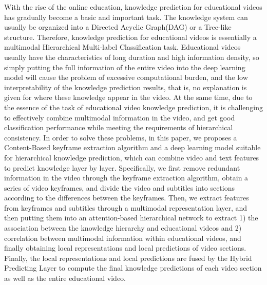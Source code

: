 \begin{abstract*}
    With the rise of the online education, knowledge prediction for educational videos has gradually become a basic and important task.
    The knowledge system can usually be organized into a Directed Acyclic Graph(DAG) or a Tree-like structure.
    Therefore, knowledge prediction for educational videos is essentially a multimodal Hierarchical Multi-label Classification task.
    Educational videos usually have the characteristics of long duration and high information density,
    so simply putting the full information of the entire video into the deep learning model will cause the problem of excessive computational burden,
    and the low interpretability of the knowledge prediction results,
    that is, no explanation is given for where these knowledge appear in the video.
    At the same time, due to the essence of the task of educational video knowledge prediction,
    it is challenging to effectively combine multimodal information in the video, and get good classification performance while meeting the requirements of hierarchical consistency.
    In order to solve these problems, in this paper, we proposes a Content-Based keyframe extraction algorithm and a deep learning model suitable for hierarchical knowledge prediction,
    which can combine video and text features to predict knowledge layer by layer.
    Specifically, we first remove redundant information in the video through the keyframe extraction algorithm,
    obtain a series of video keyframes, and divide the video and subtitles into sections according to the differences between the keyframes.
    Then, we extract features from keyframes and subtitles through a multimodal representation layer, and then putting them into an attention-based hierarchical network to extract
    1) the association between the knowledge hierarchy and educational videos and
    2) correlation between multimodal information within educational videos,
    and finally obtaining local representations and local predictions of video sections.
    Finally, the local representations and local predictions are fused by the Hybrid Predicting Layer to compute the final knowledge predictions of each video section as well as the entire educational video.
\end{abstract*}
